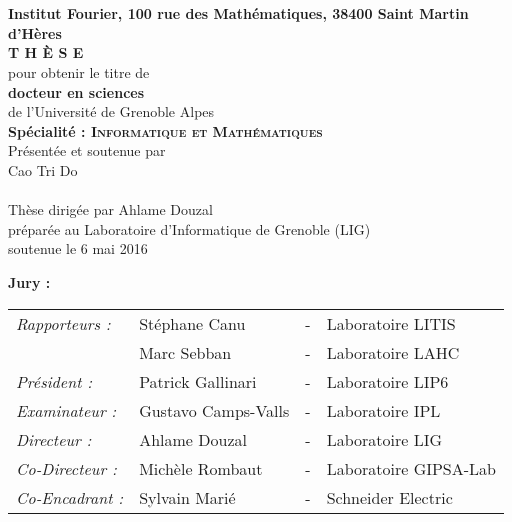 \begin{titlepage}
\begin{center}
 \\
\vspace*{0.3cm}
 \\
\noindent \textbf{Institut Fourier, 100 rue des Mathématiques, 38400 Saint Martin d'Hères} \\
\vspace*{0.5cm}
\noindent \Huge \textbf{T H È S E} \\
\vspace*{0.3cm}
\noindent \large {pour obtenir le titre de} \\
\vspace*{0.3cm}
\noindent \LARGE \textbf{docteur en sciences} \\
\vspace*{0.3cm}
\noindent \Large de l'Université de Grenoble Alpes\\
\noindent \Large \textbf{Spécialité : \textsc{Informatique et Mathématiques}}\\
\vspace*{0.4cm}
\noindent \large {Présentée et soutenue par\\}
\noindent \LARGE Cao Tri Do \\
\vspace*{0.8cm}
 \\
\vspace*{0.8cm}
\noindent \Large Thèse dirigée par Ahlame Douzal\\
\vspace*{0.2cm}
\noindent \Large préparée au Laboratoire d'Informatique de Grenoble (LIG) \\
\vspace*{0.2cm}
\noindent \large soutenue le 6 mai 2016  \\
\vspace*{0.5cm}
\end{center}
\noindent \large \textbf{Jury :} \\
\begin{center}
\noindent \large 
\begin{tabular}{llcl}
      \textit{Rapporteurs :}	& Stéphane Canu		& - & Laboratoire LITIS\\
                				& Marc Sebban		& - & Laboratoire LAHC\\
      \textit{Président :}		& Patrick Gallinari	& - & Laboratoire LIP6\\
	  \textit{Examinateur :}    & Gustavo Camps-Valls & - & Laboratoire IPL\\
      \textit{Directeur :}	    & Ahlame Douzal & - & Laboratoire LIG\\
      \textit{Co-Directeur :}	& Michèle Rombaut	& - & Laboratoire GIPSA-Lab\\
      \textit{Co-Encadrant :}	    & Sylvain Mari\'{e}	& - & Schneider Electric\\
\end{tabular}
\end{center}
\end{titlepage}
\sloppy

\titlepage

